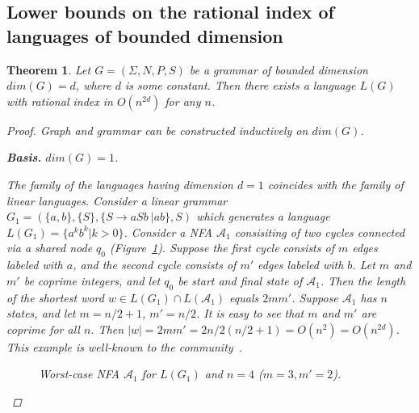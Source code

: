 \documentclass[11pt,a4paper]{article} %
\newtheorem{theorem}{Theorem}
\begin{document}
\label{sec:osc_lower}
\subsection{Lower bounds on the rational index of languages of bounded dimension}
\begin{theorem} Let $G = (\Sigma, N, P, S)$ be a grammar of bounded dimension $dim(G) = d$, where $d$ is some constant. Then there exists a language $L(G)$ with rational index in $O(n^{2d})$ for any $n$.
\begin{proof} Graph and grammar can be constructed inductively on $dim(G)$.

\textbf{Basis.} $dim(G) = 1$.

The family of the languages having dimension $d = 1$  coincides with the family of linear languages. Consider a linear grammar $G_1=(\{a, b\}, \{S\}, \{S \rightarrow aSb\ |ab\}, S)$ which generates a language $L(G_1) = \{a^kb^k \vert k > 0\}$. 
Consider a NFA $\mathcal{A}_1$ consisiting of two cycles connected via a shared node $q_0$ (Figure~\ref{worstd_1}). Suppose the first cycle consists of $m$ edges labeled with $a$, and the second cycle consists of $m'$ edges labeled with $b$. 
Let $m$ and $m'$ be coprime integers, and let $q_0$ be start and final state of $\mathcal{A}_1$. Then the length of the shortest word $w \in L(G_1) \cap L(\mathcal{A}_1)$ equals $2mm'$. Suppose $\mathcal{A}_1$ has $n$ states, and let $m = n/2 + 1$, $m'=n/2$. It is easy to see that $m$ and $m'$ are coprime for all $n$. Then $|w| = 2mm' = 2n/2(n/2 + 1) = O(n^2) = O(n^{2d})$. This example is well-known to the community~\cite{HellingsCFPQ, Yannakakis}. 

\begin{figure}[h]
    \centering        

\caption{Worst-case NFA $\mathcal{A}_1$ for $L(G_1)$ and $n=4$ ($m = 3, m' = 2$). }
\label{worstd_1}
\end{figure}


\end{proof}
\end{theorem}
\end{document}
